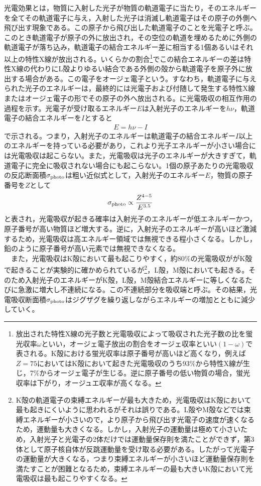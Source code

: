 光電効果とは，物質に入射した光子が物質の軌道電子に当たり，そのエネルギーを全てその軌道電子に与え，入射した光子は消滅し軌道電子はその原子の外側へ飛び出す現象である。この原子から飛び出した軌道電子のことを光電子と呼ぶ。このとき軌道電子が原子の外に放出され，その空位の軌道を埋めるために外側の軌道電子が落ち込み，軌道電子の結合エネルギー差に相当する1個あるいはそれ以上の特性X線が放出される。いくらかの割合\footnote{放出された特性X線の光子数と光電吸収によって吸収された光子数の比を蛍光収率$\omega$といい，オージェ電子放出の割合をオージェ収率といい$(1-\omega)$で表される。K殻における蛍光収率は原子番号が高いほど高くなり，例えば$Z=75$においてはK殻において起きた光電吸収のうち93$\%$から特性X線が生じ，7$\%$からオージェ電子が生じる。逆に原子番号の低い物質の場合，蛍光収率は下がり，オージュエ収率が高くなる。}でこの結合エネルギーの差は特性X線の代わりにL殻よりゆるい結合である外側の殻から軌道電子を原子外に放出する場合がある。この電子をオージェ電子という。すなわち，軌道電子に与えられた光子のエネルギーは，最終的には光電子および付随して発生する特性X線またはオージェ電子の形でその原子の外へ放出される。に光電吸収の相互作用の過程を示す。光電子が受け取るエネルギー$E$は入射光子のエネルギーを$h\nu$，軌道電子の結合エネルギーを$I$とすると
\begin{align}
E=h\nu-I \label{eq:kou_ele}
\end{align}
で示される。つまり，入射光子のエネルギーは軌道電子の結合エネルギー$I$以上のエネルギーを持っている必要があり，これより光子エネルギーが小さい場合には光電吸収は起こらない。また，光電吸収は光子のエネルギーが大きすぎて，軌道電子に完全に吸収されない場合にも起こらない。1個の原子あたりの光電吸収の反応断面積$\sigma_{\rm photo}$は粗い近似式として，入射光子のエネルギー$E$，物質の原子番号を$Z$として
\begin{align}
\sigma_{\rm{photo}}\propto\frac{Z^{4-5}}{E^{3.5}} \label{eq:sigma_photo}
\end{align}
と表され，光電吸収が起きる確率は入射光子のエネルギーが低エネルギーかつ，原子番号が高い物質ほど増大する。逆に，入射光子のエネルギーが高いほど激減するため，光電吸収は高エネルギー領域では無視できる程小さくなる。しかし，鉛のように原子番号が高い元素では無視できなくなる。\\
\ \ また，光電吸収はK殻において最も起こりやすく，約80$\%$の光電吸収ががK殻で起きることが実験的に確かめられているが\footnote{K殻の軌道電子の束縛エネルギーが最も大きため，光電吸収はK殻において最も起きにくいように思われるがそれは誤りである。L殻やM殻などでは束縛エネルギーが小さいので，より原子から飛び出す光電子の速度が速くなるため，運動量も大きくなる。しかし，入射光子の運動量は極めて小さいため，入射光子と光電子の2体だけでは運動量保存則を満たことができず，第3体として原子核自体が反跳運動量を受け取る必要がある。したがって光電子の運動量が大きくなる，つまり束縛エネルギーが小さいほど運動量保存則を満たすことが困難となるため，束縛エネルギーの最も大きいK殻において光電吸収は最も起こりやすくなる。}，L殻，M殻においても起きる。そのため入射光子のエネルギーがK殻，L殻，M殻結合エネルギーに等しくなるたびに急激に増大し不連続になる。この不連続部分を吸収端と呼ぶ。その結果，光電吸収断面積$\sigma_{\rm photo}$はジグザグを繰り返しながらエネルギーの増加とともに減少していく。

